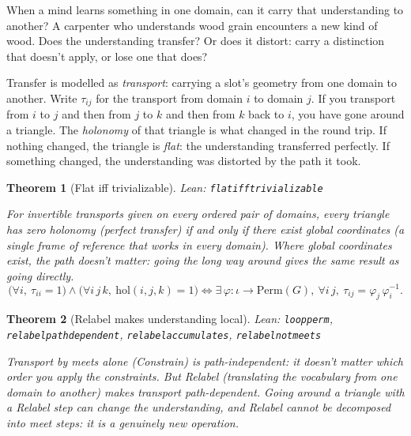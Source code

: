 \documentclass[11pt]{article}
\newcommand{\leanus}{\textunderscore\allowbreak}
\newcommand{\lean}[1]{{\let\_\leanus\texttt{#1}}}
\newtheorem{theorem}{Theorem}[section]
\theoremstyle{remark}
\begin{document}
When a mind learns something in one domain, can it carry that understanding to another?
A carpenter who understands wood grain encounters a new kind of wood. Does the understanding
transfer? Or does it distort: carry a distinction that doesn't apply, or lose one that does?

Transfer is modelled as \emph{transport}: carrying a slot's geometry from one domain to
another. Write $\tau_{ij}$ for the transport from domain $i$ to domain $j$. If you
transport from $i$ to $j$ and then from $j$ to $k$ and then from $k$ back to $i$, you
have gone around a triangle. The \emph{holonomy} of that triangle is what changed in the
round trip. If nothing changed, the triangle is \emph{flat}: the understanding transferred
perfectly. If something changed, the understanding was distorted by the path it took.

\begin{theorem}[Flat iff trivializable]
{\small\sloppy Lean: \lean{flat\_iff\_trivializable}\par}
For invertible transports given on every ordered pair of domains, every triangle has zero
holonomy (perfect transfer) if and only if there exist global coordinates (a single frame
of reference that works in every domain). Where global coordinates exist, the path doesn't
matter: going the long way around gives the same result as going directly.
\[
  \bigl(\forall i,\ \tau_{ii} = 1\bigr) \wedge \bigl(\forall i\,j\,k,\
  \mathrm{hol}(i,j,k) = 1\bigr)
  \iff
  \exists\, \varphi : \iota \to \mathrm{Perm}(G),\ \forall i\, j,\
  \tau_{ij} = \varphi_j\,\varphi_i^{-1}.
\]
\end{theorem}

\begin{theorem}[Relabel makes understanding local]
{\small\sloppy Lean: \lean{loop\_perm}, \lean{relabel\_path\_dependent},
\lean{relabel\_accumulates}, \lean{relabel\_not\_meets}\par}
Transport by meets alone (Constrain) is path-independent: it doesn't matter which order
you apply the constraints. But Relabel (translating the vocabulary from one domain to
another) makes transport path-dependent. Going around a triangle with a Relabel step can
change the understanding, and Relabel cannot be decomposed into meet steps: it is a
genuinely new operation.
\end{theorem}
\end{document}
